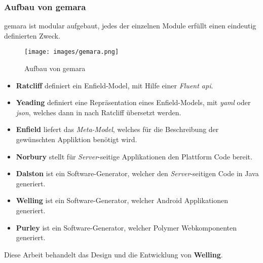 \subsubsection{Aufbau von \acs{gemara}}

\acs{gemara} ist modular aufgebaut, jedes der einzelnen Module erfüllt einen eindeutig definierten Zweck.

\begin{figure}[H]
	\begin{center}
		\texttt{[image: images/gemara.png]}
		\caption{Aufbau von \acs{gemara}}
		\label{fig:gemara}
	\end{center}
\end{figure}

\begin{itemize}
	\item \textbf{Ratcliff} definiert ein Enfield-Model, mit Hilfe einer \textit{Fluent \acs{api}}.
	\item \textbf{Yeading} definiert eine Repräsentation eines Enfield-Models, mit \textit{\acf{yaml}} oder \textit{\acf{json}}, welches dann in nach Ratcliff übersetzt werden.
	\item \textbf{Enfield} liefert das \textit{Meta-Model}, welches für die Beschreibung der gewünschten Appliktion benötigt wird.
	\item \textbf{Norbury} stellt für \textit{Server}-seitige Applikationen den Plattform Code bereit.
	\item \textbf{Dalston} ist ein Software-Generator, welcher den \textit{Server}-seitigen Code in Java generiert.
	\item \textbf{Welling} ist ein Software-Generator, welcher Android Applikationen generiert.
	\item \textbf{Purley} ist ein Software-Generator, welcher Polymer Webkomponenten generiert. 
\end{itemize}

Diese Arbeit behandelt das Design und die Entwicklung von \textbf{Welling}.